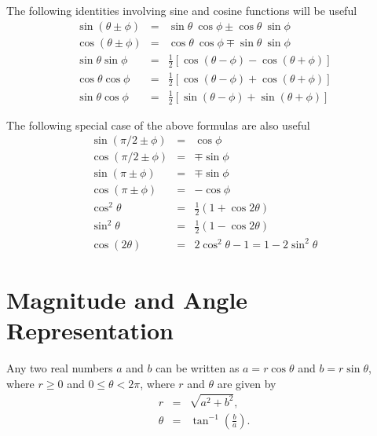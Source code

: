 The following identities involving sine and cosine functions will be useful
\begin{eqnarray}
\nonumber
\sin(\theta \pm \phi) & = & \sin \theta \ \cos \phi \pm \cos \theta \ \sin \phi \\
\nonumber
\cos(\theta \pm \phi) & = & \cos \theta \ \cos \phi \mp \sin \theta \ \sin \phi \\
\nonumber
\sin \theta \sin \phi & = & \frac12 \left[\cos(\theta-\phi) - \cos(\theta + \phi) \right] \\
\nonumber
\cos \theta \cos \phi & = & \frac12 \left[\cos(\theta-\phi) + \cos(\theta + \phi) \right] \\
\sin \theta \cos \phi & = & \frac12 \left[\sin(\theta-\phi) + \sin(\theta + \phi) \right]
\end{eqnarray}

The following special case of the above formulas are also useful
\begin{eqnarray}
\nonumber
\sin(\pi/2 \pm \phi) & = & \cos \phi \\
\nonumber
\cos(\pi/2 \pm \phi) & = & \mp \sin \phi \\
\nonumber
\sin(\pi \pm \phi) & = & \mp \sin \phi \\
\nonumber
\cos(\pi \pm \phi) & = & - \cos \phi \\
\nonumber
\cos^2 \theta & = & \frac12 \left(1+\cos 2 \theta\right) \\
\nonumber
\sin^2 \theta & = & \frac12 \left(1-\cos 2 \theta \right) \\
\nonumber
\cos(2 \theta) & = & 2 \cos^2 \theta - 1 = 1 - 2 \sin^2 \theta
\end{eqnarray}

\section{Magnitude and Angle Representation}
Any two real numbers $a$ and $b$ can be written as $a = r \cos \theta$ and $b = r \sin \theta$, where $r \geq 0$ and $0 \leq \theta < 2 \pi$, where $r$ and $\theta$ are given by
\begin{eqnarray}
  r  & = & \sqrt{a^2 + b^2}, \\
  \theta & = & \tan^{-1}\left(\frac{b}{a} \right).
  \end{eqnarray}


